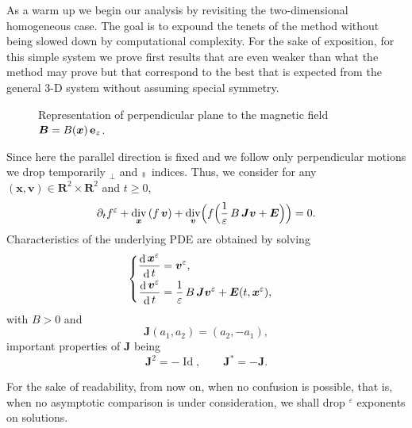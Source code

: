 \documentclass[10pt]{amsart}
\newenvironment{splitcases}
{\begin{cases}\begin{aligned}}
{\end{aligned}\end{cases}}
\newcommand{\sperp}{{\scriptscriptstyle\perp}}
\let\eps\varepsilon
\let\d\partial
\DeclareMathOperator\dD{d}\let\dd\dD
\DeclareMathOperator{\Id}{Id}
\DeclareMathOperator{\Div}{div}
\theoremstyle{plain}
\theoremstyle{definition}
\newcommand{\be}{\begin{equation}}
\newcommand{\ee}{\end{equation}}
\newcommand\R{\mathbf R}
\newcommand\bB{{\boldsymbol B}}
\newcommand\bE{{\boldsymbol E}}
\newcommand\bJ{{\boldsymbol J}}
\newcommand\bfv{{\boldsymbol v}}
\newcommand\bfx{{\boldsymbol x}}
\newcommand{\mypar}{{\mkern3mu\vphantom{\perp}\vrule depth 0pt\mkern2mu\vrule depth 0pt\mkern3mu}}
\begin{document}
As a warm up we begin our analysis by revisiting the two-dimensional homogeneous case. The goal is to expound the tenets of the method without being slowed down by computational complexity. For the sake of exposition, for this simple system we prove first results that are even weaker than what the method may prove but that correspond to the best that is expected from the general $3$-D system without assuming special symmetry.
\begin{figure}[ht!]
\begin{center}
\end{center}
\label{fig:2}
\vspace*{-.5\baselineskip}%
\caption{\smaller Representation of perpendicular plane to the magnetic
field $\bB= B(\bfx)\,{\bf e}_z$.}
\end{figure}

Since here the parallel direction is fixed and we follow only
perpendicular motions we drop temporarily ${}_\sperp$ and ${}_\mypar$
indices. Thus, we consider for any $(\bfx,\bfv)\in\R^2\times\R^2$ and
$t\geq 0$,
\be
\label{eq:vla2d}
\d_t f^\eps+\Div_\bfx \left(f\,\bfv\right)
+\Div_{\bfv}\Bigl(f\Bigl(\frac1\eps\,B\,\bJ\bfv +\bE\Bigr)\Bigr)
=0.
\ee
Characteristics of the underlying PDE are obtained by solving
\be\label{eq:xv-hom}
\begin{splitcases}
\frac{\dD\bfx^\eps}{\dD t}&=\bfv^\eps,
\\
\frac{\dD\bfv^\eps}{\dD t}&=\frac{1}{\eps}\,B\,\bJ\bfv^\eps+\bE(t,\bfx^\eps),
\end{splitcases}
\ee
with $B>0$ and
\[
\bJ\left(a_1,a_2\right)=(a_2,-a_1),
\]
important properties of $\bJ$ being
\[
\bJ^2=-\Id,
\qquad
\bJ^*=-\bJ.
\]

For the sake of readability, from now on, when no confusion is possible, that is, when no asymptotic comparison is under consideration, we shall drop ${}^\eps$ exponents on solutions.
\end{document}
